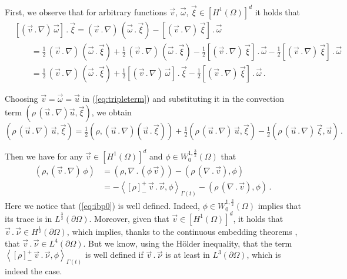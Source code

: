 First, we observe that for arbitrary functions $\vec v$,
$\vec \omega$, $\vec \xi \in [H^1(\Omega)]^d$ it holds that
\begin{align}\label{eq:tripleterm}
& [(\vec v\,.\,\nabla)\,\vec \omega]\,.\,\vec \xi
 = (\vec v\,.\,\nabla)\,(\vec \omega\,.\,\vec \xi) -
[(\vec v\,.\,\nabla)\,\vec \xi]\,.\,\vec \omega \nonumber \\
& \qquad = \tfrac{1}{2}\,(\vec v\,.\,\nabla)\,
(\vec \omega\,.\,\vec \xi) + \tfrac{1}{2}\,(\vec v\,.\,\nabla)\,
(\vec \omega\,.\,\vec \xi) -\tfrac{1}{2}[(\vec v\,.\,\nabla)\,\vec
\xi] \,.\,\vec \omega -\tfrac{1}{2}[(\vec v\,.\,\nabla)\,\vec
\xi] \,.\,\vec \omega \nonumber \\
& \qquad = \tfrac{1}{2}\,(\vec v\,.\,\nabla)\, (\vec \omega\,.\,\vec \xi) +
\tfrac{1}{2}[(\vec v\,.\,\nabla)\,\vec \omega]\,.\,\vec \xi -
\tfrac{1}{2}[(\vec v\,.\,\nabla)\,\vec \xi] \,.\,\vec \omega\,.
\end{align}

Choosing $\vec v = \vec \omega = \vec u$ in (\ref{eq:tripleterm}) and
substituting it in the convection term $\left(\rho\,(\vec u \,.\, \nabla)
\vec u,\vec \xi\right)$, we obtain
\begin{equation}\label{eq:ns_advect_tripleterm}
( \rho\,(\vec u \,.\,\nabla)\,\vec u, \vec \xi) =
\tfrac{1}{2}(\rho,(\vec u\,.\,\nabla)(\vec u\,.\,\vec \xi))
+ \tfrac{1}{2}(\rho\,(\vec u \,.\,\nabla)\,\vec u, \vec \xi)
-\tfrac{1}{2}(\rho\,(\vec u\,.\,\nabla)\,\vec \xi,\vec u)\,.
\end{equation}

Then we have for any $\vec v \in [H^1(\Omega)]^d$ and
$\phi\in W_0^{1,\frac{3}{2}}(\Omega)$ that
\begin{align}\label{eq:ibp0}
( \rho,(\vec v \,.\,\nabla)\,\phi) & = (\rho, \nabla\,.\,(\phi\,\vec v))
- (\rho\,(\nabla\,.\,\vec v), \phi) \nonumber \\ & =
- \left\langle [\rho]_-^+\,\vec v\,.\,\vec \nu,
  \phi \right\rangle_{\Gamma(t)}
- (\rho\,(\nabla\,.\,\vec v), \phi)\,.
\end{align}
Here we notice that (\ref{eq:ibp0}) is well defined. Indeed, $\phi\in
W_0^{1,\frac{3}{2}}(\Omega)$ implies that its trace is in
$L^{\frac{3}{2}}(\partial\Omega)$. Moreover, given that
$\vec v \in [H^1(\Omega)]^d$, it holds that $\vec v\,.\,\vec\nu \in
H^{\frac{1}{2}}(\partial\Omega)$, which implies, thanks to the continuous
embedding theorems \cite[Theorem~6.5 and 6.7]{DINEZZA2012}, that $\vec
v\,.\,\vec\nu \in L^4(\partial\Omega)$. But we know, using the
H\"{o}lder inequality, that the term $\left\langle [\rho]_-^+\,\vec v\,.\,
\vec \nu, \phi \right\rangle_{\Gamma(t)}$ is well defined if
$\vec v\,.\,\vec\nu$ is at least in $L^3(\partial\Omega)$, which is indeed the
case.

